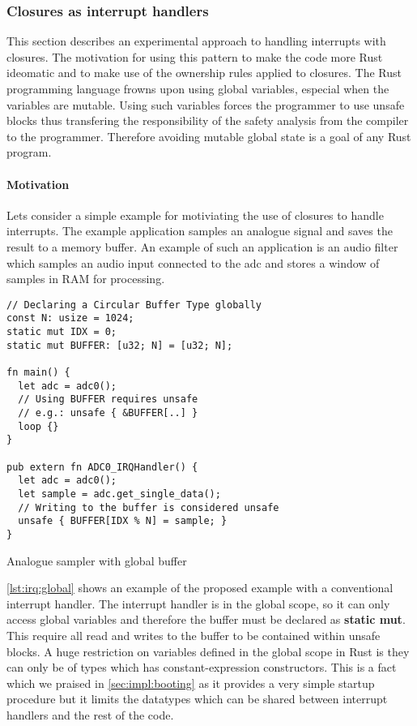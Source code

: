 \subsubsection{Closures as interrupt handlers}
\label{sec:irq-closures}

This section describes an experimental approach to handling interrupts with closures.
The motivation for using this pattern to make the code more Rust ideomatic and to make use of the ownership rules applied to closures.
The Rust programming language frowns upon using global variables, especial when the variables are mutable.
Using such variables forces the programmer to use unsafe blocks thus transfering the responsibility of the safety analysis from the compiler to the programmer.
Therefore avoiding mutable global state is a goal of any Rust program.

\paragraph{Motivation}
\label{par:irq:motivation}

Lets consider a simple example for motiviating the use of closures to handle interrupts.
The example application samples an analogue signal and saves the result to a memory buffer.
An example of such an application is an audio filter which samples an audio input connected to the \gls{adc} and stores a window of samples in RAM for processing.

\begin{listing}[H]
  \begin{verbatim}
// Declaring a Circular Buffer Type globally
const N: usize = 1024;
static mut IDX = 0;
static mut BUFFER: [u32; N] = [u32; N];

fn main() {
  let adc = adc0();
  // Using BUFFER requires unsafe
  // e.g.: unsafe { &BUFFER[..] }
  loop {}
}

pub extern fn ADC0_IRQHandler() {
  let adc = adc0();
  let sample = adc.get_single_data();
  // Writing to the buffer is considered unsafe
  unsafe { BUFFER[IDX % N] = sample; }
}
  \end{verbatim}
  \caption{Analogue sampler with global buffer}
  \label{lst:irq:global}
\end{listing}

\autoref{lst:irq:global} shows an example of the proposed example with a conventional interrupt handler.
The interrupt handler is in the global scope, so it can only access global variables and therefore the buffer must be declared as \textbf{static mut}.
This require all read and writes to the buffer to be contained within unsafe blocks.
A huge restriction on variables defined in the global scope in Rust is they can only be of types which has constant-expression constructors.
This is a fact which we praised in \autoref{sec:impl:booting} as it provides a very simple startup procedure but it limits the datatypes which can be shared between interrupt handlers and the rest of the code.

